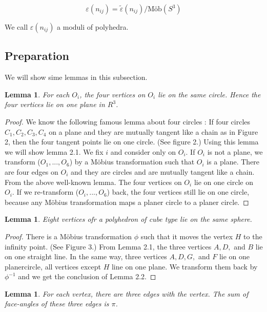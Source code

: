 \documentclass[dvipdfmx]{interact}
\theoremstyle{plain}%
\newtheorem{lemma}[theorem]{Lemma}
\theoremstyle{definition}
\theoremstyle{remark}
\theoremstyle{problemstyle}
\begin{document}
$$
\varepsilon (n_{ij}) = \tilde\varepsilon(n_{ij}) / \text{M\"ob}(S^3)
$$

We call $\varepsilon(n_{ij})$ a moduli of polyhedra.

\subsection{Preparation}

We will show sime lemmas in this subsection.

\begin{lemma}
For each $O_i$, the four vertices on $O_i$ lie on the same circle.
Hence the four vertices lie on one plane in $R^3$.
\end{lemma}

\begin{proof}
 We know the following famous lemma about four circles : If four circles 
 $C_1, C_2, C_3, C_4$ on a plane and they are mutually tangent like a
 chain as in Figure 2, then the four tangent points lie on one circle.
 (See figure 2.) Using this lemma we will show lemma 2.1. We fix $i$ and
 consider only on $O_i$. If $O_i$ is not a plane, we transform 
 ($O_1, ..., O_6$) by a M\"obius transformation such that $O_i$ is a
 plane. There are four edges on $O_i$ and they are circles and are
 mutually tangent like a chain. From the above well-known lemma. The
 four vertices on $O_i$ lie on one circle on $O_i$. If we re-transform
 ($O_i, ..., O_6$) back, the four vertices still lie on one circle,
 because any M\"obius transformation maps a planer circle to a planer circle.
\end{proof}

\begin{lemma}
 Eight vertices ofr a polyhedron of cube type lie on the same sphere.
\end{lemma}

\begin{proof}
 There is a M\"obius transformation $\phi$ such that it moves the vertex
 $H$ to the infinity point. (See Figure 3.) From Lemma 2.1, the three
 vertices $A, D,$ and $B$ lie on one straight line. In the same way,
 three vertices $A, D, G,$ and $F$ lie on one planercircle, all vertices
 except $H$ line on one plane. We transform them back by $\phi^{-1}$ and
 we get the conclusion of Lemma 2.2.
\end{proof}

\begin{lemma}
 For each vertex, there are three edges with the vertex. The sum of
 face-angles of these three edges is $\pi$.
\end{lemma}
\end{document}
